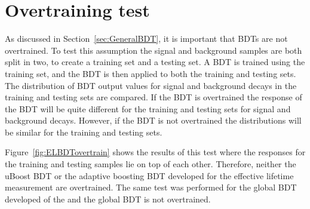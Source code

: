 \section{Overtraining test}
As discussed in Section~\ref{sec:GeneralBDT}, it is important that BDTs are not overtrained. %
To test this assumption the signal and background samples are both split in two, to create a training set and a testing set.
A BDT is trained using the training set, and the BDT is then applied to both the training and testing sets. The distribution of BDT output values for signal and background decays in the training and testing sets are compared. If the BDT is overtrained the response of the BDT will be quite different for the training and testing sets for signal and background decays. However, if the BDT is not overtrained the distributions will be similar for the training and testing sets. 

Figure~\ref{fig:ELBDTovertrain} shows the results of this test where the responses for the training and testing samples lie on top of each other. Therefore, neither the uBoost BDT or the adaptive boosting BDT developed for the effective lifetime measurement are overtrained. The same test was performed for the global BDT developed of the \BFm and the global BDT is not overtrained.  

